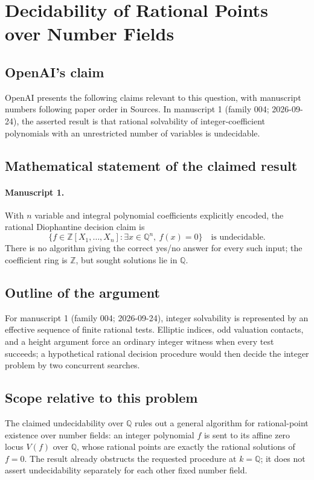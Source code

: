 \documentclass[11pt]{article}
\begin{document}
\section*{Decidability of Rational Points over Number Fields}

\subsection{OpenAI's claim}
OpenAI presents the following claims relevant to this question, with manuscript numbers following paper order in Sources. In manuscript 1 (family 004; 2026-09-24), the asserted result is that rational solvability of integer-coefficient polynomials with an unrestricted number of variables is undecidable.

\subsection{Mathematical statement of the claimed result}
\paragraph{Manuscript 1.}
With $n$ variable and integral polynomial coefficients explicitly encoded, the rational Diophantine decision claim is
\[
 \{f\in\mathbb Z[X_1,\ldots,X_n]:\exists x\in\mathbb Q^n,\ f(x)=0\}
 \quad\text{is undecidable}.
\]
There is no algorithm giving the correct yes/no answer for every such input; the coefficient ring is $\mathbb Z$, but sought solutions lie in $\mathbb Q$.

\subsection{Outline of the argument}
For manuscript 1 (family 004; 2026-09-24), integer solvability is represented by an effective sequence of finite rational tests. Elliptic indices, odd valuation contacts, and a height argument force an ordinary integer witness when every test succeeds; a hypothetical rational decision procedure would then decide the integer problem by two concurrent searches.

\subsection{Scope relative to this problem}
The claimed undecidability over $\mathbb Q$ rules out a general algorithm for rational-point existence over number fields: an integer polynomial $f$ is sent to its affine zero locus $V(f)$ over $\mathbb Q$, whose rational points are exactly the rational solutions of $f=0$. The result already obstructs the requested procedure at $k=\mathbb Q$; it does not assert undecidability separately for each other fixed number field.
\end{document}
